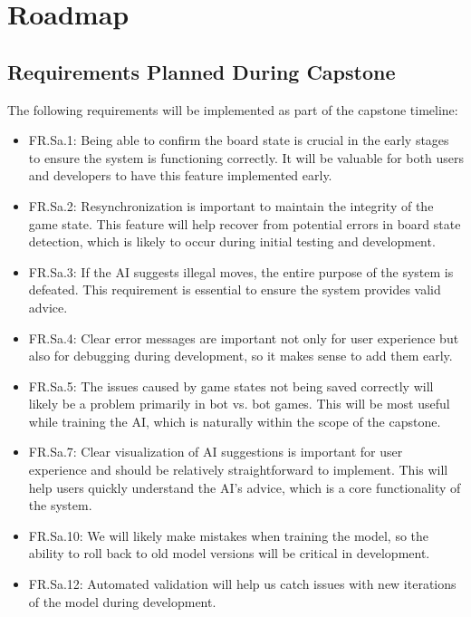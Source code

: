 \documentclass{article}
\begin{document}
\section{Roadmap}\label{sec:roadmap}

\subsection{Requirements Planned During Capstone}\label{subsec:requirements-planned-during-capstone}
The following requirements will be implemented as part of the capstone timeline:
\begin{itemize}
    \item FR.Sa.1: Being able to confirm the board state is crucial in the early stages to ensure the system is functioning correctly.
          It will be valuable for both users and developers to have this feature implemented early.
    \item FR.Sa.2: Resynchronization is important to maintain the integrity of the game state.
          This feature will help recover from potential errors in board state detection, which is likely to occur during initial testing and development.
    \item FR.Sa.3: If the AI suggests illegal moves, the entire purpose of the system is defeated.
          This requirement is essential to ensure the system provides valid advice.
    \item FR.Sa.4: Clear error messages are important not only for user experience but also for debugging during development, so it makes sense to add them early.
    \item FR.Sa.5: The issues caused by game states not being saved correctly will likely be a problem primarily in bot vs. bot games.
          This will be most useful while training the AI, which is naturally within the scope of the capstone.
    \item FR.Sa.7: Clear visualization of AI suggestions is important for user experience and should be relatively straightforward to implement.
          This will help users quickly understand the AI's advice, which is a core functionality of the system.
    \item FR.Sa.10: We will likely make mistakes when training the model, so the ability to roll back to old model versions will be critical in development.
    \item FR.Sa.12: Automated validation will help us catch issues with new iterations of the model during development.
\end{itemize}
\end{document}
